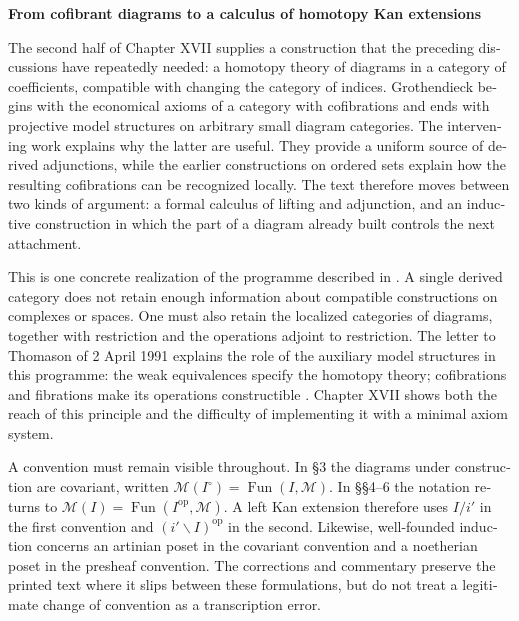 \begin{otherlanguage}{english}
\noindent\textbf{From cofibrant diagrams to a calculus of homotopy Kan extensions}

The second half of Chapter XVII supplies a construction that the preceding discussions have repeatedly needed: a homotopy theory of diagrams in a category of coefficients, compatible with changing the category of indices. Grothendieck begins with the economical axioms of a category with cofibrations and ends with projective model structures on arbitrary small diagram categories. The intervening work explains why the latter are useful. They provide a uniform source of derived adjunctions, while the earlier constructions on ordered sets explain how the resulting cofibrations can be recognized locally. The text therefore moves between two kinds of argument: a formal calculus of lifting and adjunction, and an inductive construction in which the part of a diagram already built controls the next attachment.

This is one concrete realization of the programme described in \citet[\S69, opening discussion]{Grothendieck1983}. A single derived category does not retain enough information about compatible constructions on complexes or spaces. One must also retain the localized categories of diagrams, together with restriction and the operations adjoint to restriction. The letter to Thomason of 2 April 1991 explains the role of the auxiliary model structures in this programme: the weak equivalences specify the homotopy theory; cofibrations and fibrations make its operations constructible \citep[point~1, printed pp.~3--4]{Grothendieck1991Letter}. Chapter XVII shows both the reach of this principle and the difficulty of implementing it with a minimal axiom system.

A convention must remain visible throughout. In \S3 the diagrams under construction are covariant, written $\mathcal M(I^{\circ})=\operatorname{Fun}(I,\mathcal M)$. In \S\S4--6 the notation returns to $\mathcal M(I)=\operatorname{Fun}(I^{\mathrm{op}},\mathcal M)$. A left Kan extension therefore uses $I/i'$ in the first convention and $(i'\backslash I)^{\mathrm{op}}$ in the second. Likewise, well-founded induction concerns an artinian poset in the covariant convention and a noetherian poset in the presheaf convention. The corrections and commentary preserve the printed text where it slips between these formulations, but do not treat a legitimate change of convention as a transcription error.


\end{otherlanguage}

